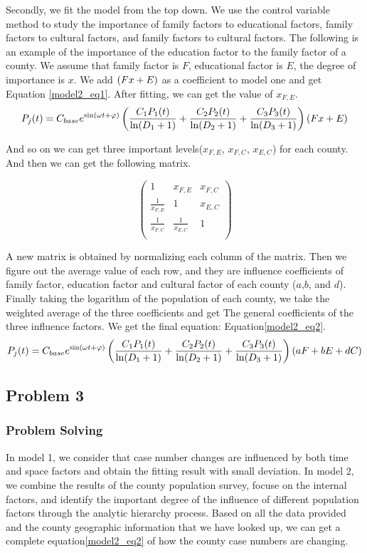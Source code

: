 \documentclass{mcmthesis}
\begin{document}
Secondly, we fit the model from the top down. We use the control variable method to study the importance of family factors to educational factors, family factors to cultural factors, and family factors to cultural factors. The following is an example of the importance of the education factor to the family factor of a county. We assume that family factor is $F$, educational factor is $E$, the degree of importance is $x$. We add $\left( F\*x+E\right) $ as a coefficient to model one and get Equation \eqref{model2_eq1}. After fitting, we can get the value of $x_{F,E}$.
\begin{equation}
P_{j}(t) = C_{base} e^{\sin (\omega t+\varphi)} \left(\frac{C_1 P_1(t)}{\ln (D_1+1)}+\frac{C_2 P_2(t)}{\ln (D_2+1)}+\frac{C_3 P_3(t)}{\ln (D_3+1)}\right)\left( F\*x+E\right)
\label{model2_eq1}
\end{equation}

And so on we can get three important levels($x_{F,E}$, $x_{F,C}$, $x_{E,C}$) for each county. And then we can get the following matrix.

\[
\begin{pmatrix}
{1 } & {x_{F,E} } & {x_{F,C} }  \\
{\frac{1}{x_{F,E}}} & {1 } & {x_{E,C} }  \\
{\frac{1}{x_{F,C} } } & {\frac{1}{x_{E,C}} } & {1}  \\
\end{pmatrix}
\]

A new matrix is obtained by normalizing each column of the matrix. Then we figure out the average value of each row, and they are influence coefficients of family factor, education factor and cultural factor of each county ($a$,$b$, and $d$). Finally taking the logarithm of the population of each county, we take the weighted average of the three coefficients and get The general coefficients of the three influence factors. We get the final equation: Equation\eqref{model2_eq2}.
\begin{equation}
P_{j}(t) = C_{base} e^{\sin (\omega t+\varphi)} \left(\frac{C_1 P_1(t)}{\ln (D_1+1)}+\frac{C_2 P_2(t)}{\ln (D_2+1)}+\frac{C_3 P_3(t)}{\ln (D_3+1)}\right)\left(a\*F+b\*E+d\*C\right)
\label{model2_eq2}
\end{equation}

\subsection{Problem 3}
\subsubsection{Problem Solving}
In model 1, we consider that case number changes are influenced by both time and space factors and obtain the fitting result with small deviation. In model 2, we combine the results of the county population survey, focuse on the internal factors, and identify the important degree of the influence of different population factors through the analytic hierarchy process. Based on all the data provided and the county geographic information that we have looked up, we can get a complete equation\eqref{model2_eq2} of how the county case numbers are changing.
\end{document}
